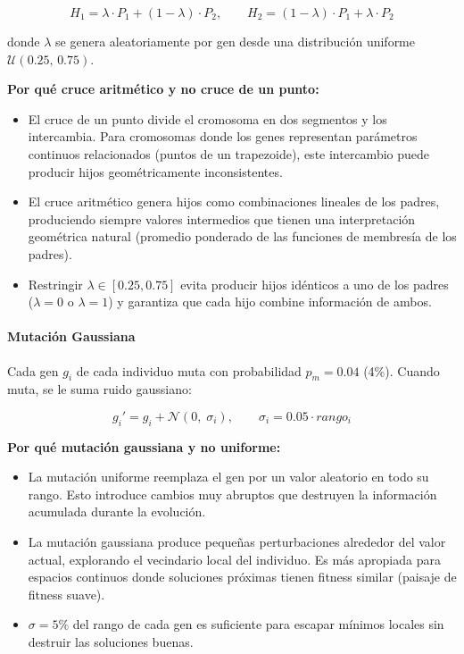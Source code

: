 \documentclass[11pt]{article}
\begin{document}
\begin{equation}
    H_1 = \lambda \cdot P_1 + (1 - \lambda) \cdot P_2, \qquad H_2 = (1 - \lambda) \cdot P_1 + \lambda \cdot P_2
\end{equation}

donde $\lambda$ se genera aleatoriamente por gen desde una distribuci\'on uniforme $\mathcal{U}(0.25,\, 0.75)$.

\textbf{Por qu\'e cruce aritm\'etico y no cruce de un punto:}
\begin{itemize}
    \item El cruce de un punto divide el cromosoma en dos segmentos y los intercambia. Para cromosomas donde los genes representan par\'ametros continuos relacionados (puntos de un trapezoide), este intercambio puede producir hijos geom\'etricamente inconsistentes.
    \item El cruce aritm\'etico genera hijos como combinaciones lineales de los padres, produciendo siempre valores intermedios que tienen una interpretaci\'on geom\'etrica natural (promedio ponderado de las funciones de membres\'ia de los padres).
    \item Restringir $\lambda \in [0.25, 0.75]$ evita producir hijos id\'enticos a uno de los padres ($\lambda = 0$ o $\lambda = 1$) y garantiza que cada hijo combine informaci\'on de ambos.
\end{itemize}

\paragraph{Mutación Gaussiana}

Cada gen $g_i$ de cada individuo muta con probabilidad $p_m = 0.04$ (4\%). Cuando muta, se le suma ruido gaussiano:

\begin{equation}
    g_i' = g_i + \mathcal{N}(0,\; \sigma_i), \qquad \sigma_i = 0.05 \cdot rango_i
\end{equation}

\textbf{Por qu\'e mutaci\'on gaussiana y no uniforme:}
\begin{itemize}
    \item La mutaci\'on uniforme reemplaza el gen por un valor aleatorio en todo su rango. Esto introduce cambios muy abruptos que destruyen la informaci\'on acumulada durante la evoluci\'on.
    \item La mutaci\'on gaussiana produce peque\~nas perturbaciones alrededor del valor actual, explorando el vecindario local del individuo. Es m\'as apropiada para espacios continuos donde soluciones pr\'oximas tienen fitness similar (paisaje de fitness suave).
    \item $\sigma = 5\%$ del rango de cada gen es suficiente para escapar m\'inimos locales sin destruir las soluciones buenas.
\end{itemize}
\end{document}
